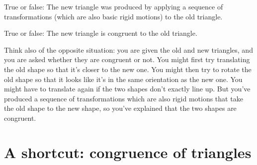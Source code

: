 \documentclass{ximera}
\begin{document}
\begin{example}
\begin{question}
True or false: The new triangle was produced by applying a sequence of transformations (which are also basic rigid motions) to the old triangle.
\begin{multipleChoice}
\end{multipleChoice}
\end{question}

\begin{question}
True or false: The new triangle is congruent to the old triangle.
\begin{multipleChoice}
\end{multipleChoice}
\end{question}

\end{example}

Think also of the opposite situation: you are given the old and new triangles, and you are asked whether they are congruent or not. You might first try translating the old shape so that it's closer to the new one. You might then try to rotate the old shape so that it looks like it's in the same orientation as the new one. You might have to translate again if the two shapes don't exactly line up. But you've produced a sequence of transformations which are also rigid motions that take the old shape to the new shape, so you've explained that the two shapes are congruent.



\section{A shortcut: congruence of triangles}
\end{document}
